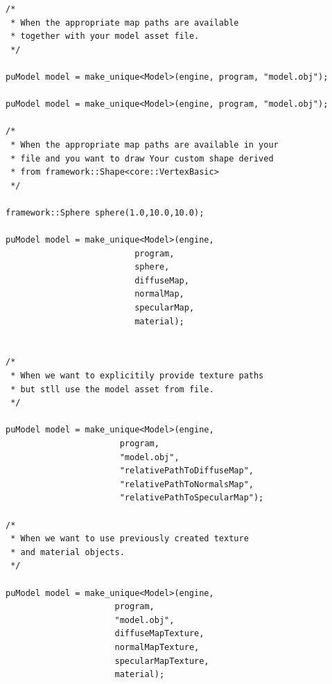 \documentclass{article}
\begin{document}
\begin{lstlisting}
/* 
 * When the appropriate map paths are available
 * together with your model asset file.
 */

puModel model = make_unique<Model>(engine, program, "model.obj");

puModel model = make_unique<Model>(engine, program, "model.obj");

/*
 * When the appropriate map paths are available in your
 * file and you want to draw Your custom shape derived 
 * from framework::Shape<core::VertexBasic> 
 */

framework::Sphere sphere(1.0,10.0,10.0);

puModel model = make_unique<Model>(engine,
                          program,
                          sphere,
                          diffuseMap,
                          normalMap,
                          specularMap,
                          material);
    
         
/* 
 * When we want to explicitily provide texture paths
 * but stll use the model asset from file.   
 */
                      
puModel model = make_unique<Model>(engine,
                       program,
                       "model.obj",
                       "relativePathToDiffuseMap",
                       "relativePathToNormalsMap",
                       "relativePathToSpecularMap");
                       
/*
 * When we want to use previously created texture
 * and material objects.
 */

puModel model = make_unique<Model>(engine,
                      program,
                      "model.obj",
                      diffuseMapTexture,
                      normalMapTexture,
                      specularMapTexture,
                      material);
\end{lstlisting}
\end{document}
